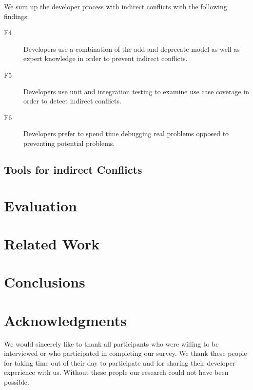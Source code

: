 \documentclass[conference]{IEEEtran}
\begin{document}
We sum up the developer process with indirect conflicts with the following findings:
\begin{description}
	\item[F4] Developers use a combination of the add and deprecate model as well as expert knowledge in order to prevent indirect conflicts.
	\item[F5] Developers use unit and integration testing to examine use case coverage in order to detect indirect conflicts.
	\item[F6] Developers prefer to spend time debugging real problems opposed to preventing potential problems.
\end{description}

\subsection{Tools for indirect Conflicts}
\label{sec:td}




\section{Evaluation}
\label{sec:eval}

\section{Related Work}
\label{sec:related}

\section{Conclusions}
\label{sec:conc}

\section{Acknowledgments}

We would sincerely like to thank all participants who were willing to be interviewed or who participated
in completing our survey. We thank these people for taking time out of their day to participate and for
sharing their developer experience with us. Without these people our research could not have been possible.


\balance


\end{document}
